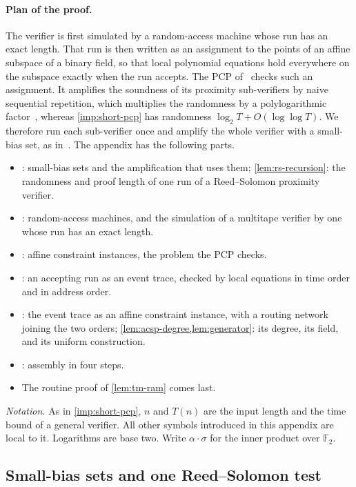 \documentclass[11pt,letterpaper]{article}
\theoremstyle{definition}
\theoremstyle{remark}
\newcommand{\lgx}{\log_2}
\begin{document}
\paragraph{Plan of the proof.} The verifier is first simulated by a
random-access machine whose run has an exact length. That run is then
written as an assignment to the points of an affine subspace of a
binary field, so that local polynomial equations hold everywhere on the
subspace exactly when the run accepts. The PCP of~\cite{BCGT13} checks
such an assignment. It amplifies the soundness of its proximity
sub-verifiers by naive sequential repetition, which multiplies the
randomness by a polylogarithmic factor~\cite[Remark~11.2 and
Lemmas~C.6--C.8]{BCGT13}, whereas \cref{imp:short-pcp} has randomness
\(\lgx T+O(\log\log T)\). We therefore run each sub-verifier once and
amplify the whole verifier with a small-bias set, as
in~\cite[Section~4.4]{BV14}. The appendix has the following parts.
\begin{itemize}
\item {}: small-bias sets and the
amplification that uses them; \cref{lem:rs-recursion}: the randomness
and proof length of one run of a Reed--Solomon proximity verifier.
\item {}: random-access machines, and the
simulation of a multitape verifier by one whose run has an exact
length.
\item {}: affine constraint instances, the problem the PCP
checks.
\item {}: an accepting run as an event trace, checked by
local equations in time order and in address order.
\item {}: the event trace as an affine constraint
instance, with a routing network joining the two orders;
\cref{lem:acsp-degree,lem:generator}: its degree, its field, and its
uniform construction.
\item {}: assembly in four steps.
\item The routine proof of \cref{lem:tm-ram} comes last.
\end{itemize}

\emph{Notation.} As in \cref{imp:short-pcp}, \(n\) and \(T(n)\) are the
input length and the time bound of a general verifier. All other
symbols introduced in this appendix are local to it. Logarithms are
base two. Write \(\alpha\cdot\sigma\) for the inner product over
\(\mathbb F_2\).

\subsection{Small-bias sets and one Reed--Solomon test}
\end{document}
